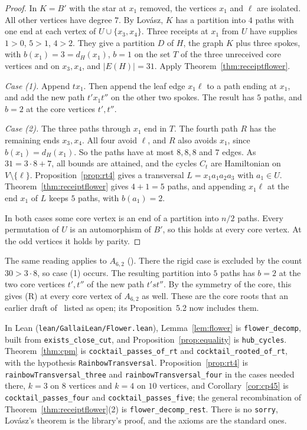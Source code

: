 \documentclass[11pt]{amsart}
\theoremstyle{definition}
\begin{document}
\begin{proof}
In $K=B'$ with the star at $x_1$ removed, the vertices $x_1$ and $\ell$ are isolated. All other
vertices have degree $7$. By Lov\'asz, $K$ has a partition into $4$ paths with one end at each
vertex of $U\cup\{x_3,x_4\}$. Three receipts at $x_1$ from $U$ have supplies $1>0$, $5>1$, $4>2$.
They give a partition $D$ of $H$, the graph $K$ plus three spokes, with $b(x_1)=3=d_H(x_1)$, $b=1$
on the set $T$ of the three unreceived core vertices and on $x_3,x_4$, and $|E(H)|=31$. Apply
Theorem~\ref{thm:receiptflower}.

\emph{Case (1).} Append $tx_1$. Then append the leaf edge $x_1\ell$ to a path ending at $x_1$, and
add the new path $t'x_1t''$ on the other two spokes. The result has $5$ paths, and $b=2$ at the
core vertices $t',t''$.

\emph{Case (2).} The three paths through $x_1$ end in $T$. The fourth path $R$ has the remaining
ends $x_3,x_4$. All four avoid $\ell$, and $R$ also avoids $x_1$, since $b(x_1)=d_H(x_1)$. So the
paths have at most $8,8,8$ and $7$ edges. As $31=3\cdot8+7$, all bounds are attained, and the
cycles $C_t$ are Hamiltonian on $V\setminus\{\ell\}$. Proposition~\ref{prop:rt4} gives a transversal
$L=x_1a_1a_2a_3$ with $a_1\in U$. Theorem~\ref{thm:receiptflower} gives $4+1=5$ paths, and
appending $x_1\ell$ at the end $x_1$ of $L$ keeps $5$ paths, with $b(a_1)=2$.

In both cases some core vertex is an end of a partition into $n/2$ paths. Every permutation of $U$
is an automorphism of $B'$, so this holds at every core vertex. At the odd vertices it holds by
parity.
\end{proof}

The same reading applies to $A_{6,2}$ (\cite[Proposition~5.2]{MM}). There the rigid case is
excluded by the count $30>3\cdot8$, so case (1) occurs. The resulting partition into $5$ paths has
$b=2$ at the two core vertices $t',t''$ of the new path $t'st''$. By the symmetry of the core, this
gives (R) at every core vertex of $A_{6,2}$ as well. These are the core roots that an earlier draft
of~\cite{MM} listed as open; its Proposition~5.2 now includes them.

{\sloppy In Lean (\texttt{lean/GallaiLean/Flower.lean}), Lemma~\ref{lem:flower} is
\texttt{flower\_decomp}, built from \texttt{exists\_close\_cut}, and Proposition~\ref{prop:equality}
is \texttt{hub\_cycles}. Theorem~\ref{thm:cpm} is \texttt{cocktail\_passes\_of\_rt} and
\texttt{cocktail\_rooted\_of\_rt}, with the hypothesis \texttt{RainbowTransversal}.
Proposition~\ref{prop:rt4} is \texttt{rainbowTransversal\_three} and
\texttt{rainbowTransversal\_four} in the cases needed there, $k=3$ on $8$ vertices and $k=4$ on
$10$ vertices, and Corollary~\ref{cor:cp45} is \texttt{cocktail\_passes\_four} and
\texttt{cocktail\_passes\_five}; the general recombination of Theorem~\ref{thm:receiptflower}(2) is
\texttt{flower\_decomp\_rest}. There is no \texttt{sorry}, Lov\'asz's theorem is the library's
proof, and the axioms are the standard ones.\par}
\end{document}
